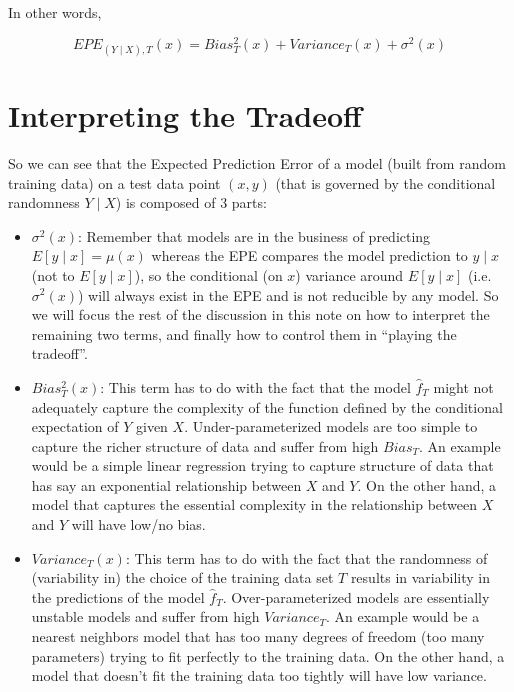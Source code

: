 \documentclass[11pt]{article}   	%
\begin{document}
In other words,

$$EPE_{(Y \mid X), T}(x) = Bias^2_T(x) + Variance_T(x) + \sigma^2(x)$$

\section{Interpreting the Tradeoff}

So we can see that the Expected Prediction Error of a model (built from random training data) on a test data point $(x, y)$ (that is governed by the conditional randomness $Y \mid X$) is composed of 3 parts:

\begin{itemize}
\item $\sigma^2(x)$: Remember that models are in the business of predicting $E[y \mid x] = \mu(x)$ whereas the EPE compares the model prediction to $y \mid x$ (not to $E[y \mid x]$), so the conditional (on $x$) variance around $E[y \mid x]$ (i.e. $\sigma^2(x)$) will always exist in the EPE and is not reducible by any model. So we will focus the rest of the discussion in this note on how to interpret the remaining two terms, and finally how to control them in ``playing the tradeoff''.
\item $Bias^2_T(x)$: This term has to do with the fact that the model $\hat{f}_T$ might not adequately capture the complexity of the function defined by the conditional expectation of $Y$ given $X$. Under-parameterized models are too simple to capture the richer structure of data and suffer from high $Bias_T$. An example would be a simple linear regression trying to capture structure of data that has say an exponential relationship between $X$ and $Y$. On the other hand, a model that captures the essential complexity in the relationship between $X$ and $Y$ will have low/no bias.
\item $Variance_T(x)$: This term has to do with the fact that the randomness of (variability in) the choice of the training data set $T$ results in variability in the predictions of the model $\hat{f}_T$. Over-parameterized models are essentially unstable models and suffer from high $Variance_T$. An example would be a nearest neighbors model that has too many degrees of freedom (too many parameters) trying to fit perfectly to the training data. On the other hand, a model  that doesn't fit the training data too tightly will have low variance.
\end{itemize}
\end{document}
